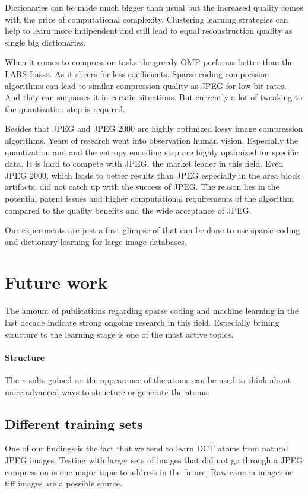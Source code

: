 Dictionaries can be made much bigger than usual but the increased quality
comes with the price of computational complexity. Clustering learning strategies
can help to learn more indipendent and still lead to equal reconstruction
quality as single big dictionaries.

When it comes to compression tasks the greedy OMP performs better
than the LARS-Lasso. As it sheers for less coefficients. Sparse coding 
compression algorithms can lead to similar compression quality as JPEG 
for low bit rates. And they can surpasses it in certain situations. But
currently a lot of tweaking to the quantization step is required. 

Besides that JPEG and JPEG 2000 are highly optimized lossy image compression
algorithms. Years of research went into observation human vision. Especially the
quantization and and the entropy encoding step are highly optimized for specific
data. It is hard to compete with JPEG, the market leader in this field.  Even
JPEG 2000, which leads to better results than JPEG especially in the area block
artifacts, did not catch up with the success of JPEG. The reason lies in the
potential patent issues and higher computational requirements of the algorithm
compared to the quality benefits and the wide acceptance of JPEG.

Our experiments are just a first glimpse of that can be done to use sparse
coding and dictionary learning for large image databases.

\section{Future work}
The amount of publications regarding sparse coding and machine learning in the
last decade indicate strong ongoing research in this field. Especially
brining structure to the learning stage is one of the most active topics.

\paragraph{Structure}
The results gained on the appearance of the atoms can be used to think
about more advanced ways to structure or generate the atoms.

\subsection{Different training sets}
One of our findings is the fact that we tend to learn DCT atoms from natural
JPEG images. Testing with larger sets of images that did not go through a JPEG
compression is one major topic to address in the future. Raw camera images or
tiff images are a possible source. 


